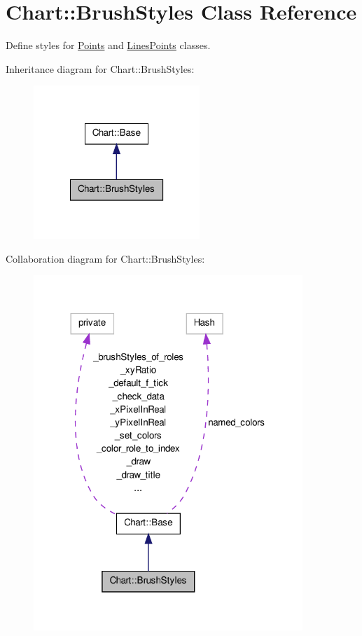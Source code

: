 \hypertarget{classChart_1_1BrushStyles}{
\section{Chart::BrushStyles Class Reference}
\label{classChart_1_1BrushStyles}
}


Define styles for \hyperlink{classChart_1_1Points}{Points} and \hyperlink{classChart_1_1LinesPoints}{LinesPoints} classes.  




Inheritance diagram for Chart::BrushStyles:\nopagebreak
\begin{figure}[H]
\begin{center}
\leavevmode
\includegraphics[width=178pt]{classChart_1_1BrushStyles__inherit__graph}
\end{center}
\end{figure}


Collaboration diagram for Chart::BrushStyles:\nopagebreak
\begin{figure}[H]
\begin{center}
\leavevmode
\includegraphics[width=288pt]{classChart_1_1BrushStyles__coll__graph}
\end{center}
\end{figure}

